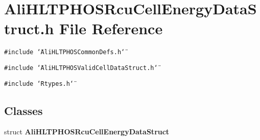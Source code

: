 \section{Ali\-HLTPHOSRcu\-Cell\-Energy\-Data\-Struct.h File Reference}
\label{AliHLTPHOSRcuCellEnergyDataStruct_8h}


{\tt \#include \char`\"{}Ali\-HLTPHOSCommon\-Defs.h\char`\"{}}\par
{\tt \#include \char`\"{}Ali\-HLTPHOSValid\-Cell\-Data\-Struct.h\char`\"{}}\par
{\tt \#include \char`\"{}Rtypes.h\char`\"{}}\par
\subsection*{Classes}
\begin{CompactItemize}
\item 
struct {\bf Ali\-HLTPHOSRcu\-Cell\-Energy\-Data\-Struct}
\end{CompactItemize}
